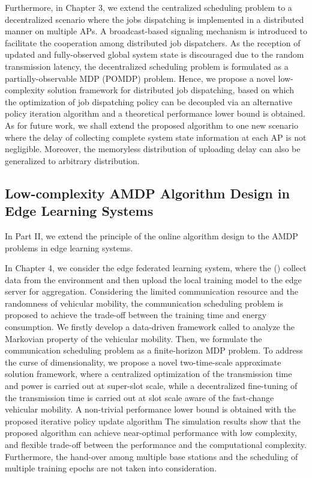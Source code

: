 Furthermore, in Chapter 3, we extend the centralized scheduling problem to a decentralized scenario where the jobs dispatching is implemented in a distributed manner on multiple APs.
A broadcast-based signaling mechanism is introduced to facilitate the cooperation among distributed job dispatchers.
As the reception of updated and fully-observed global system state is discouraged due to the random transmission latency, the decentralized scheduling problem is formulated as a partially-observable MDP (POMDP) problem.
Hence, we propose a novel low-complexity solution framework for distributed job dispatching, based on which the optimization of job dispatching policy can be decoupled via an alternative policy iteration algorithm and a theoretical performance lower bound is obtained.
As for future work, we shall extend the proposed algorithm to one new scenario where the delay of collecting complete system state information at each AP is not negligible. Moreover, the memoryless distribution of uploading delay can also be generalized to arbitrary distribution.


\subsection{Low-complexity AMDP Algorithm Design in Edge Learning Systems}
In Part II, we extend the principle of the online algorithm design to the AMDP problems in edge learning systems.
%

In Chapter 4, we consider the edge federated learning system, where the {\IAVFullnames} ({\IAVs}) collect data from the environment and then upload the local training model to the edge server for aggregation.
Considering the limited communication resource and the randomness of vehicular mobility, the communication scheduling problem is proposed to achieve the trade-off between the training time and energy consumption.
We firstly develop a data-driven framework called {\fwName} to analyze the Markovian property of the vehicular mobility.
Then, we formulate the communication scheduling problem as a finite-horizon MDP problem.
To address the curse of dimensionality, we propose a novel two-time-scale approximate solution framework, where a centralized optimization of the transmission time and power is carried out at super-slot scale, while a decentralized fine-tuning of the transmission time is carried out at slot scale aware of the fast-change vehicular mobility.
A non-trivial performance lower bound is obtained with the proposed iterative policy update algorithm
The simulation results show that the proposed algorithm can achieve near-optimal performance with low complexity, and flexible trade-off between the performance and the computational complexity.
Furthermore, the hand-over among multiple base stations and the scheduling of multiple training epochs are not taken into consideration.

